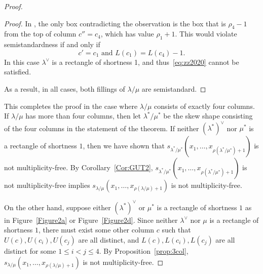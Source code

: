 \begin{proof}
\begin{proof}
In , the only box contradicting the observation is the box that is $\rho_4-1$ from the top of column $c''=c_4$, which has value $\rho_1+1$. This would violate semistandardness if and only if
\begin{equation}
\label{eq:zz2020}
c'=c_1\text{ and }L(c_1) = L(c_4)-1.
\end{equation}
In this case $\lambda^\vee$ is a rectangle of shortness 1, and thus~\eqref{eq:zz2020} cannot be satisfied.

As a result, in all cases, both fillings of $\lambda/\mu$ are semistandard.
\end{proof}

This completes the proof in the case where $\lambda/\mu$ consists of exactly four columns. If $\lambda/\mu$ has more than four columns, then let $\lambda^*/\mu^*$ be the skew shape consisting of the four columns in the statement of the theorem. If neither $(\lambda^*)^\vee$ nor $\mu^*$ is a rectangle of shortness $1$, then we have shown that $s_{\lambda^*/\mu^*}(x_1,\dots, x_{\rho(\lambda^*/\mu^*) + 1})$ is not multiplicity-free. By Corollary~\ref{Cor:GUT2}, $s_{\lambda^*/\mu^*}(x_1,\dots, x_{\rho(\lambda^*/\mu^*) + 1})$ is not multiplicity-free implies $s_{\lambda/\mu}(x_1,\dots, x_{\rho(\lambda/\mu) + 1})$ is not multiplicity-free.

On the other hand, suppose either $(\lambda^*)^\vee$ or $\mu^*$ is a rectangle of shortness $1$ as in Figure~\ref{Figure2a} or Figure~\ref{Figure2d}. Since neither $\lambda^\vee$ nor $\mu$ is a rectangle of shortness $1$, there must exist some other column $c$ such that $U(c),U(c_i),U(c_j)$ are all distinct, and $L(c),L(c_i),L(c_j)$ are all distinct for some $1\leq i<j\leq 4$. By Proposition~\ref{prop:3col}, $s_{\lambda/\mu}(x_1,\dots, x_{\rho(\lambda/\mu)+1})$ is not multiplicity-free.
\end{proof}
